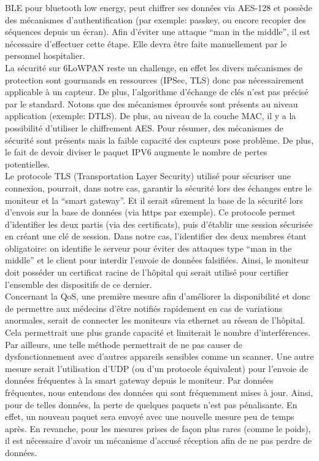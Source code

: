 \documentclass{article}
\begin{document}
BLE pour bluetooth low energy, peut chiffrer ses données via AES-128 et possède des mécanismes d’authentification (par exemple: passkey,  ou encore recopier des séquences depuis un écran). Afin d’éviter une attaque “man in the middle”, il est nécessaire d’effectuer cette étape. Elle devra être faite manuellement par le personnel hospitalier. 
\\

La sécurité sur 6LoWPAN reste un challenge, en effet les divers mécanismes de protection sont gourmands en ressources (IPSec, TLS) donc pas nécessairement applicable à un capteur. De plus, l’algorithme d’échange de clés n’est pas précisé par le standard. Notons que des mécanismes éprouvés sont présents au niveau application (exemple: DTLS). De plus, au niveau de la couche MAC, il y a la possibilité d’utiliser le chiffrement AES. Pour résumer, des mécanismes de sécurité sont présents mais la faible capacité des capteurs pose problème. De plus, le fait de devoir diviser le paquet IPV6 augmente le nombre de pertes potentielles.
\\

Le protocole TLS (Transportation Layer Security) utilisé pour sécuriser une connexion, pourrait, dans notre cas, garantir la sécurité lors des échanges entre le moniteur et la “smart gateway”.  Et il serait sûrement la base de la sécurité lors d’envois sur la base de données (via https par exemple). Ce protocole permet d’identifier les deux partis (via des certificats), puis d’établir une session sécurisée en créant une clé de session. Dans notre cas, l’identifier des deux membres étant obligatoire: on identifie le serveur pour éviter des attaques type “man in the middle” et le client pour interdir l’envoie de données falsifiées. Ainsi, le moniteur doit posséder un certificat racine de l’hôpital qui serait utilisé pour certifier l’ensemble des dispositifs de ce dernier.
\\

Concernant la QoS, une première mesure afin d’améliorer la disponibilité et donc de permettre aux médecins d’être notifiés rapidement en cas de variations anormales, serait de connecter les moniteurs via ethernet au réseau de l’hôpital. Cela permettrait une plus grande capacité et limiterait le nombre d’interférences. Par ailleurs, une telle méthode permettrait de ne pas causer de dysfonctionnement avec d’autres appareils sensibles comme un scanner. Une autre mesure serait l’utilisation d’UDP (ou d’un protocole équivalent) pour l’envoie de données fréquentes à la smart gateway depuis le moniteur. Par données fréquentes, nous entendons des données qui sont fréquemment mises à jour. Ainsi, pour de telles données, la perte de quelques paquets n’est pas pénalisante. En effet, un nouveau paquet sera envoyé avec une nouvelle mesure peu de temps après. En revanche, pour les mesures prises de façon plus rares (comme le poids), il est nécessaire d’avoir un mécanisme d’accusé réception afin de ne pas perdre de données.
\end{document}
